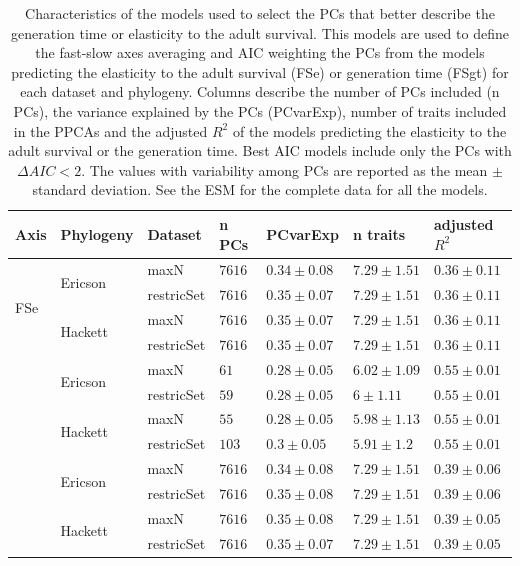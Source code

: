 \begin{table}[ht!]
\center
\caption[FS PCs models]{
Characteristics of the models used to select the PCs that better describe the
generation time or elasticity to the adult survival. This models are used to
define the fast-slow axes averaging and AIC weighting the PCs from the models
predicting the elasticity to the adult survival (FSe) or generation time (FSgt)
for each dataset and phylogeny. Columns describe the number of PCs included (n
PCs), the variance explained by the PCs (PCvarExp), number of traits included in
the PPCAs and the adjusted $R^{2}$ of the models predicting the elasticity to
the adult survival or the generation time. Best AIC models include only the PCs
with $\Delta AIC < 2$. The values with variability among PCs are reported as the
mean $\pm$ standard deviation. See the ESM for the complete data for all the
models.
}
\label{tab:tabApp2.1}
\begin{tabular}{@{}lllllll@{}}
\toprule
Axis & Phylogeny & Dataset & n PCs & PCvarExp & n traits & adjusted $R^{2}$\\
\midrule
\multirow{4}{*}{FSe} & \multirow{2}{*}{Ericson} & maxN & $7616$ & $0.34\pm0.08$ & $7.29\pm1.51$ & $0.36\pm0.11$\\
 &  & restricSet & $7616$ & $0.35\pm0.07$ & $7.29\pm1.51$ & $0.36\pm0.11$\\
 & \multirow{2}{*}{Hackett}& maxN & $7616$ & $0.35\pm0.07$ & $7.29\pm1.51$ & $0.36\pm0.11$\\
 &  & restricSet & $7616$ & $0.35\pm0.07$ & $7.29\pm1.51$ & $0.36\pm0.11$\\
\addlinespace
\multirow{4}{*}{FSe best AIC} & \multirow{2}{*}{Ericson} & maxN & $61$ &
$0.28\pm0.05$ & $6.02\pm1.09$ & $0.55\pm0.01$\\
 &  & restricSet & $59$ & $0.28\pm0.05$ & $6\pm1.11$ & $0.55\pm0.01$\\
 & \multirow{2}{*}{Hackett} & maxN & $55$ & $0.28\pm0.05$ & $5.98\pm1.13$ & $0.55\pm0.01$\\
 &  & restricSet & $103$ & $0.3\pm0.05$ & $5.91\pm1.2$ & $0.55\pm0.01$\\
\addlinespace
\multirow{4}{*}{FSgt} & \multirow{2}{*}{Ericson} & maxN & $7616$ & $0.34\pm0.08$ & $7.29\pm1.51$ & $0.39\pm0.06$\\
 &  & restricSet & $7616$ & $0.35\pm0.08$ & $7.29\pm1.51$ & $0.39\pm0.06$\\
 & \multirow{2}{*}{Hackett} & maxN & $7616$ & $0.35\pm0.08$ & $7.29\pm1.51$ & $0.39\pm0.05$\\
 &  & restricSet & $7616$ & $0.35\pm0.07$ & $7.29\pm1.51$ & $0.39\pm0.05$\\

\end{tabular}
\end{table}

